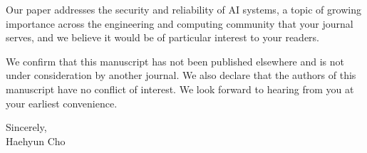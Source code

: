 \documentclass[11pt]{article}
\begin{document}
Our paper addresses the security and reliability of AI systems, a topic of growing importance across the engineering and computing community that your journal serves, and we believe it would be of particular interest to your readers.

We confirm that this manuscript has not been published elsewhere and is not under consideration by another journal. We also declare that the authors of this manuscript have no conflict of interest. We look forward to hearing from you at your earliest convenience.

\vspace{1\baselineskip}

\hfill\begin{minipage}{0.3\textwidth}
  Sincerely,\\[2\baselineskip]
  Haehyun Cho
\end{minipage}
\end{document}
